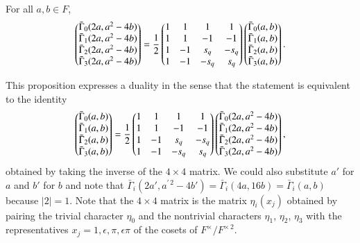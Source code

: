 \documentclass{amsart}
\newcommand\bGamma{\bar\Gamma}
\newenvironment{cthm}[1]
  {\renewcommand\thethm{\bf #1}\thm}
  {\endthm}
\begin{document}
\noindent
\begin{cthm}{Proposition 2.1}  For all $a,b\in F$,
$$\begin{pmatrix}\bGamma_0(2a,a^2-4b) \\
          \bGamma_1(2a,a^2-4b) \\
          \bGamma_2(2a,a^2-4b) \\
          \bGamma_3(2a,a^2-4b) \end{pmatrix}
= {1\over 2}
\begin{pmatrix}1&1&1&1\\
        1&1&-1&-1\\
        1&-1&s_q&-s_q\\
        1&-1&-s_q&s_q\end{pmatrix}
\begin{pmatrix}\bGamma_0(a,b)\\
        \bGamma_1(a,b)\\
        \bGamma_2(a,b)\\
        \bGamma_3(a,b)\end{pmatrix}.
$$
\end{cthm}

This proposition expresses a duality in the sense that the statement
is equivalent to the identity
$$\begin{pmatrix}\bGamma_0(a,b) \\
          \bGamma_1(a,b) \\
          \bGamma_2(a,b) \\
          \bGamma_3(a,b) \end{pmatrix}
= {1\over 2}
\begin{pmatrix}1&1&1&1\\
        1&1&-1&-1\\
        1&-1&s_q&-s_q\\
        1&-1&-s_q&s_q\end{pmatrix}
\begin{pmatrix}\bGamma_0(2a,a^2-4b)\\
        \bGamma_1(2a,a^2-4b)\\
        \bGamma_2(2a,a^2-4b)\\
        \bGamma_3(2a,a^2-4b)\end{pmatrix},
$$
obtained by taking the inverse of the $4\times 4$ matrix.  We could
also substitute $a'$ for $a$ and $b'$ for $b$ and note that
$\bGamma_i(2a',a^{\prime\,2} - 4b') = \bGamma_i(4a,16b) = \bGamma_i(a,b)$
because $|2|=1$. Note that the $4\times 4$ matrix is the
matrix $\eta_i(x_j)$ obtained by pairing the trivial character
$\eta_0$ and the nontrivial characters
$\eta_1$, $\eta_2$, $\eta_3$ with the
representatives $x_j = 1,\epsilon,\pi,\epsilon\pi$
of the cosets of $F^\times/F^{\times\,2}$.
\end{document}
